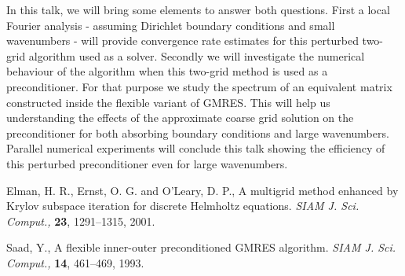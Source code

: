 \documentclass{report}
\begin{document}
In this talk, we will bring some elements to answer both questions. First
a local Fourier analysis - assuming Dirichlet boundary conditions and
small wavenumbers - will provide convergence rate estimates for this
perturbed two-grid algorithm used as a solver. Secondly we will
investigate the numerical behaviour of the algorithm when this two-grid
method is used as a preconditioner. For that purpose we study the
spectrum of an equivalent matrix constructed inside the flexible variant
of GMRES. This will help us understanding the effects of the approximate
coarse grid solution on the preconditioner for both absorbing boundary
conditions and large wavenumbers. Parallel numerical experiments will
conclude this talk showing the efficiency of this perturbed
preconditioner even for large wavenumbers.\\

\begin{thebibliography}{2}

Elman, H. R., Ernst, O. G. and O'Leary, D. P., A multigrid method enhanced by {K}rylov
subspace iteration for discrete {H}elmholtz equations. {\itshape SIAM J. Sci. Comput.,}
{\bfseries 23}, 1291--1315, 2001.

Saad, Y., A flexible inner-outer preconditioned GMRES algorithm.
{\itshape SIAM J. Sci. Comput.,}
{\bfseries 14}, 461--469, 1993.

\end{thebibliography}
\end{document}

